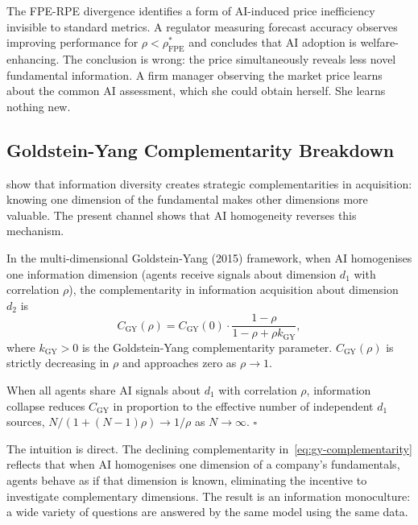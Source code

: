 The FPE-RPE divergence identifies a form of AI-induced price inefficiency invisible to standard metrics. A regulator measuring forecast accuracy observes improving performance for $\rho < \rho_{\text{FPE}}^*$ and concludes that AI adoption is welfare-enhancing. The conclusion is wrong: the price simultaneously reveals less novel fundamental information. A firm manager observing the market price learns about the common AI assessment, which she could obtain herself. She learns nothing new.

\subsection{Goldstein-Yang Complementarity Breakdown}

\citet{goldstein2015} show that information diversity creates strategic complementarities in acquisition: knowing one dimension of the fundamental makes other dimensions more valuable. The present channel shows that AI homogeneity reverses this mechanism.

\begin{proposition}\label{prop:gy-breakdown}
  In the multi-dimensional Goldstein-Yang (2015) framework, when AI homogenises one information dimension (agents receive signals about dimension $d_1$ with correlation $\rho$), the complementarity in information acquisition about dimension $d_2$ is
  \begin{equation}\label{eq:gy-complementarity}
    C_{\text{GY}}(\rho) = C_{\text{GY}}(0) \cdot \frac{1-\rho}{1-\rho+\rho k_{\text{GY}}},
  \end{equation}
  where $k_{\text{GY}} > 0$ is the Goldstein-Yang complementarity parameter. $C_{\text{GY}}(\rho)$ is strictly decreasing in $\rho$ and approaches zero as $\rho \to 1$.

   When all agents share AI signals about $d_1$ with correlation $\rho$, information collapse reduces $C_{\text{GY}}$ in proportion to the effective number of independent $d_1$ sources, $N/(1+(N-1)\rho) \to 1/\rho$ as $N \to \infty$. $\square$
\end{proposition}

The intuition is direct. The declining complementarity in~\eqref{eq:gy-complementarity} reflects that when AI homogenises one dimension of a company's fundamentals, agents behave as if that dimension is known, eliminating the incentive to investigate complementary dimensions. The result is an information monoculture: a wide variety of questions are answered by the same model using the same data.

